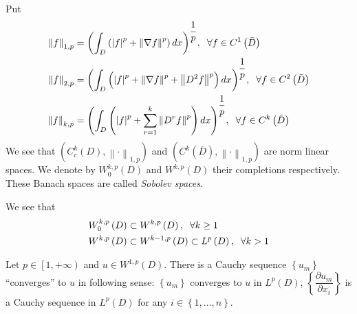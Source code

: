 \documentclass[a4paper]{article}
\numberwithin{equation}{section}
\begin{document}
Put 
\begin{align}
{\left\| f \right\|_{1,p}} &= {\left( {\int_D {\left( {{{\left| f \right|}^p} + {{\left\| {\nabla f} \right\|}^p}} \right)dx} } \right)^{\dfrac{1}{p}}},\hspace{0.2cm}\forall f \in {C^1}\left( {\bar D} \right)\\
{\left\| f \right\|_{2,p}} &= {\left( {\int_D {\left( {{{\left| f \right|}^p} + {{\left\| {\nabla f} \right\|}^p} + {{\left\| {{D^2}f} \right\|}^p}} \right)dx} } \right)^{\dfrac{1}{p}}},\hspace{0.2cm}\forall f \in {C^2}\left( {\bar D} \right)\\
{\left\| f \right\|_{k,p}} &= {\left( {\int_D {\left( {{{\left| f \right|}^p} + \sum\limits_{r = 1}^k {{{\left\| {{D^r}f} \right\|}^p}} } \right)dx} } \right)^{\dfrac{1}{p}}},\hspace{0.2cm}\forall f \in {C^k}\left( {\bar D} \right)
\end{align}
We see that  $\left( {C_c^k\left( D \right),{{\left\|  \cdot  \right\|}_{1,p}}} \right)$ and $\left( {{C^k}\left( {\overline D } \right),{{\left\|  \cdot  \right\|}_{1,p}}} \right)$ are norm linear spaces. We denote by $W_0^{k,p}\left( D \right)$ and ${W^{k,p}}\left( D \right)$ their completions respectively. These Banach spaces are called \textit{Sobolev spaces.}

We see that
\begin{align}
W_0^{k,p}\left( D \right) &\subset {W^{k,p}}\left( D \right),\hspace{0.2cm}\forall k \ge 1\\
{W^{k,p}}\left( D \right) &\subset {W^{k - 1,p}}\left( D \right) \subset {L^p}\left( D \right),\hspace{0.2cm}\forall k > 1
\end{align}

Let $p \in \left[ {1, + \infty } \right)$ and $u \in {W^{1,p}}\left( D \right)$. There is a Cauchy sequence $\left\{ {{u_m}} \right\}$ ``converges'' to $u$ in following sense: $\left\{ {{u_m}} \right\}$ converges to $u$ in $L^p\left(D\right)$, $\left\{ {\dfrac{{\partial {u_m}}}{{\partial {x_i}}}} \right\}$ is a Cauchy sequence in $L^p\left(D\right)$ for any $i \in \left\{ {1, \ldots ,n} \right\}$.
\end{document}
